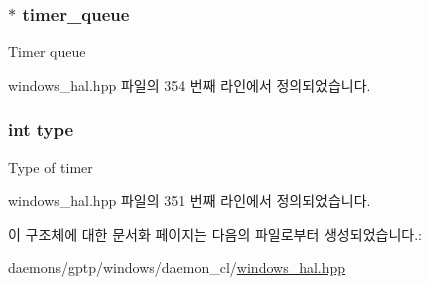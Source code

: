\subsubsection[{\texorpdfstring{timer\+\_\+queue}{timer_queue}}]{$\ast$ timer\+\_\+queue}\hypertarget{struct_windows_timer_queue_handler_arg_ae010a6908adeba19377ec504fe70f9cb}{}\label{struct_windows_timer_queue_handler_arg_ae010a6908adeba19377ec504fe70f9cb}
Timer queue 

windows\+\_\+hal.\+hpp 파일의 354 번째 라인에서 정의되었습니다.

\subsubsection[{\texorpdfstring{type}{type}}]{\setlength{\rightskip}{0pt plus 5cm}int type}\hypertarget{struct_windows_timer_queue_handler_arg_ac765329451135abec74c45e1897abf26}{}\label{struct_windows_timer_queue_handler_arg_ac765329451135abec74c45e1897abf26}
Type of timer 

windows\+\_\+hal.\+hpp 파일의 351 번째 라인에서 정의되었습니다.



이 구조체에 대한 문서화 페이지는 다음의 파일로부터 생성되었습니다.\+:\begin{DoxyCompactItemize}
\item 
daemons/gptp/windows/daemon\+\_\+cl/\hyperlink{windows__hal_8hpp}{windows\+\_\+hal.\+hpp}\end{DoxyCompactItemize}
